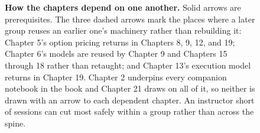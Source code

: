 \documentclass{book}
\newlength{\bookcapwidth}
\begin{document}
\begin{figure}[htbp]
\begin{lrbox}{\bookmeasuredbox}
\begin{tikzpicture}[
  >=stealth,
  grp/.style={draw,rounded corners=3pt,align=center,font=\footnotesize,
              inner sep=4pt},
  main/.style={->,thick},
  back/.style={->,dashed,gray!65,thin},
]
\end{tikzpicture}
\end{lrbox}
\ifdim\wd\bookmeasuredbox<0.65\linewidth
\setlength{\bookcapwidth}{0.65\linewidth}
\else
\setlength{\bookcapwidth}{\wd\bookmeasuredbox}
\fi
\usebox{\bookmeasuredbox}
\par\vspace{8pt}
\begin{minipage}{\bookcapwidth}
\small \textbf{How the chapters depend on one another.} Solid arrows are
prerequisites. The three dashed arrows mark the places where a later group
reuses an earlier one's machinery rather than rebuilding it: Chapter 5's option
pricing returns in Chapters 8, 9, 12, and 19; Chapter 6's models are reused by
Chapter 9 and Chapters 15 through 18 rather than retaught; and Chapter 13's
execution model returns in Chapter 19. Chapter 2 underpins every companion
notebook in the book and Chapter 21 draws on all of it, so neither is drawn with
an arrow to each dependent chapter. An instructor short of sessions can cut most
safely within a group rather than across the spine.
\end{minipage}
\end{figure}
\end{document}
